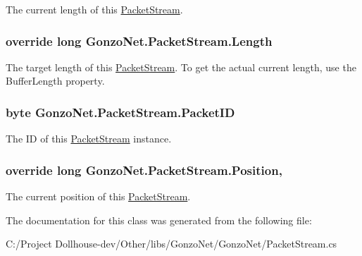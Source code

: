 The current length of this \hyperlink{class_gonzo_net_1_1_packet_stream}{Packet\+Stream}. 

\hypertarget{class_gonzo_net_1_1_packet_stream_a8d15de3e1c877c4e8dc19080b6f6d3ec}{
\subsubsection[{Length}]{\setlength{\rightskip}{0pt plus 5cm}override long Gonzo\+Net.\+Packet\+Stream.\+Length\hspace{0.3cm}{\ttfamily [get]}}}\label{class_gonzo_net_1_1_packet_stream_a8d15de3e1c877c4e8dc19080b6f6d3ec}


The target length of this \hyperlink{class_gonzo_net_1_1_packet_stream}{Packet\+Stream}. To get the actual current length, use the Buffer\+Length property. 

\hypertarget{class_gonzo_net_1_1_packet_stream_af7bf56ad63d4b95316b95bb1e601cdd3}{
\subsubsection[{Packet\+I\+D}]{\setlength{\rightskip}{0pt plus 5cm}byte Gonzo\+Net.\+Packet\+Stream.\+Packet\+I\+D\hspace{0.3cm}{\ttfamily [get]}}}\label{class_gonzo_net_1_1_packet_stream_af7bf56ad63d4b95316b95bb1e601cdd3}


The I\+D of this \hyperlink{class_gonzo_net_1_1_packet_stream}{Packet\+Stream} instance. 

\hypertarget{class_gonzo_net_1_1_packet_stream_a31c12428a8c4be18a8230252c95f6bcc}{
\subsubsection[{Position}]{\setlength{\rightskip}{0pt plus 5cm}override long Gonzo\+Net.\+Packet\+Stream.\+Position\hspace{0.3cm}{\ttfamily [get]}, {\ttfamily [set]}}}\label{class_gonzo_net_1_1_packet_stream_a31c12428a8c4be18a8230252c95f6bcc}


The current position of this \hyperlink{class_gonzo_net_1_1_packet_stream}{Packet\+Stream}. 



The documentation for this class was generated from the following file\+:\begin{DoxyCompactItemize}
\item 
C\+:/\+Project Dollhouse-\/dev/\+Other/libs/\+Gonzo\+Net/\+Gonzo\+Net/Packet\+Stream.\+cs\end{DoxyCompactItemize}
